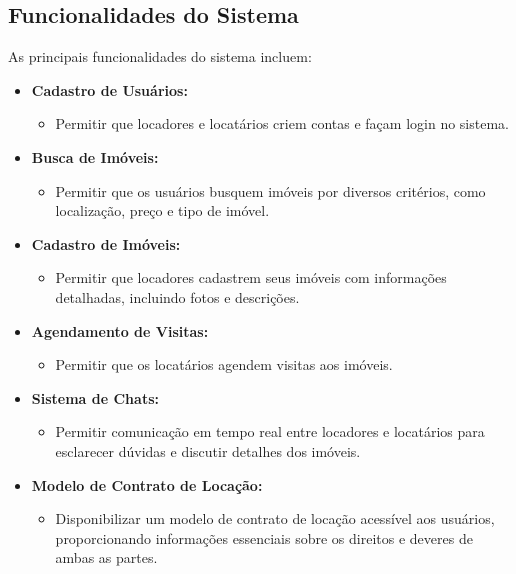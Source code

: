 \subsection{Funcionalidades do Sistema}
As principais funcionalidades do sistema incluem:

\begin{itemize}
    \item \textbf{Cadastro de Usuários:}
    \begin{itemize}
        \item Permitir que locadores e locatários criem contas e façam login no sistema.
    \end{itemize}
    
    \item \textbf{Busca de Imóveis:}
    \begin{itemize}
        \item Permitir que os usuários busquem imóveis por diversos critérios, como localização, preço e tipo de imóvel.
    \end{itemize}
    
    \item \textbf{Cadastro de Imóveis:}
    \begin{itemize}
        \item Permitir que locadores cadastrem seus imóveis com informações detalhadas, incluindo fotos e descrições.
    \end{itemize}
    
    \item \textbf{Agendamento de Visitas:}
    \begin{itemize}
        \item Permitir que os locatários agendem visitas aos imóveis.
    \end{itemize}
    
    \item \textbf{Sistema de Chats:}
    \begin{itemize}
        \item Permitir comunicação em tempo real entre locadores e locatários para esclarecer dúvidas e discutir detalhes dos imóveis.
    \end{itemize}

    \item \textbf{Modelo de Contrato de Locação:}
    \begin{itemize}
        \item Disponibilizar um modelo de contrato de locação acessível aos usuários, proporcionando informações essenciais sobre os direitos e deveres de ambas as partes.
    \end{itemize}
\end{itemize}

